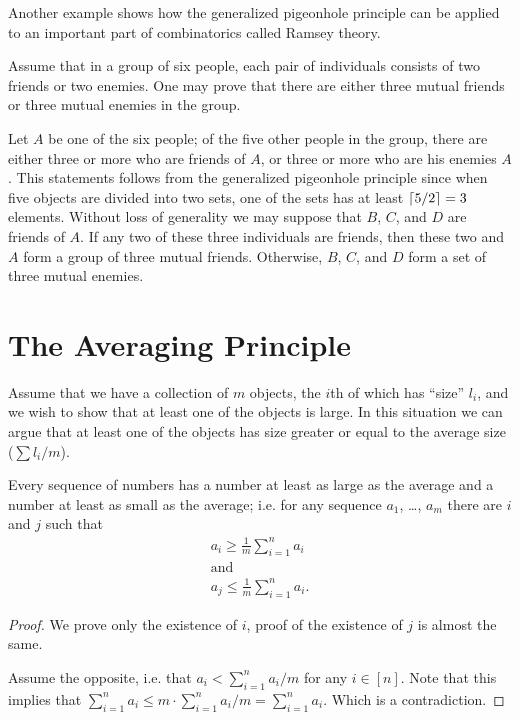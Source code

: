 Another example shows how the generalized pigeonhole principle can be applied
to an important part of combinatorics called Ramsey theory.

Assume that in a group of six people, each pair of individuals consists of two
friends or two enemies. One may prove that there are either three mutual
friends or three mutual enemies in the group.

Let $A$ be one of the six people; of the five other people in the group, there
are either three or more who are friends of $A$, or three or more who are
his enemies $A$. This statements follows from the generalized pigeonhole
principle since when five objects are divided into two sets, one of the sets
has at least $\left\lceil {5 / 2} \right\rceil = 3$ elements. Without loss of generality we may
suppose that $B$, $C$, and $D$ are friends of $A$. If any two of these three
individuals are friends, then these two and $A$ form a group of three mutual
friends. Otherwise, $B$, $C$, and $D$ form a set of three mutual enemies.

\section{The Averaging Principle}
Assume that we have a collection of $m$ objects, the $i$th of which has
``size'' $l_i$, and we wish to show that at least one of the objects is large.
In this situation we can argue that at least one of the objects has size
greater or equal to the average size ($\sum l_i / m$).
\begin{theorem}
\label{theorem:averaging-principle}
  Every sequence of numbers has a number at least as large as the average and a
  number at least as small as the average; i.e. for any sequence $a_1$, \dots,
  $a_m$ there are $i$ and $j$ such that
  \begin{gather*}
    a_i \ge \frac{1}{m} \sum_{i = 1}^n a_i \\
    \text{and} \\
    a_j \le \frac{1}{m} \sum_{i = 1}^n a_i.
  \end{gather*}
\end{theorem}
\begin{proof}
  We prove only the existence of $i$, proof of the existence of $j$ is almost
  the same.

  Assume the opposite, i.e. that $a_i < \sum_{i = 1}^n a_i / m$
  for any $i \in [n]$. Note that this implies that
  $\sum_{i = 1}^n a_i \le m \cdot \sum_{i = 1}^n a_i / m = \sum_{i = 1}^n a_i$.
  Which is a contradiction.
\end{proof}

